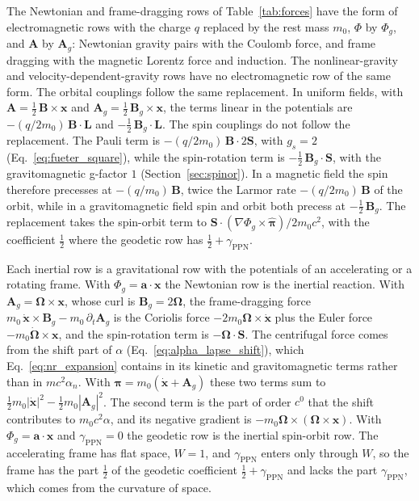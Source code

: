 \documentclass[aps,prd,onecolumn,tightenlines,nofootinbib,notitlepage,11pt,floatfix]{revtex4-2}
\theoremstyle{indentedtheorem}
\begin{document}
The Newtonian and frame-dragging rows of Table~\ref{tab:forces} have the form of electromagnetic rows with the charge $q$ replaced by the rest mass $m_0$, $\Phi$ by $\Phi_g$, and $\mathbf{A}$ by $\mathbf{A}_g$: Newtonian gravity pairs with the Coulomb force, and frame dragging with the magnetic Lorentz force and induction. The nonlinear-gravity and velocity-dependent-gravity rows have no electromagnetic row of the same form. The orbital couplings follow the same replacement. In uniform fields, with $\mathbf{A}=\tfrac{1}{2}\,\mathbf{B}\times\mathbf{x}$ and $\mathbf{A}_g=\tfrac{1}{2}\,\mathbf{B}_g\times\mathbf{x}$, the terms linear in the potentials are $-(q/2m_0)\,\mathbf{B}\cdot\mathbf{L}$ and $-\tfrac{1}{2}\,\mathbf{B}_g\cdot\mathbf{L}$. The spin couplings do not follow the replacement. The Pauli term is $-(q/2m_0)\,\mathbf{B}\cdot2\mathbf{S}$, with $g_s=2$ (Eq.~\eqref{eq:fueter_square}), while the spin-rotation term is $-\tfrac{1}{2}\,\mathbf{B}_g\cdot\mathbf{S}$, with the gravitomagnetic g-factor $1$ (Section~\ref{sec:spinor}). In a magnetic field the spin therefore precesses at $-(q/m_0)\,\mathbf{B}$, twice the Larmor rate $-(q/2m_0)\,\mathbf{B}$ of the orbit, while in a gravitomagnetic field spin and orbit both precess at $-\tfrac{1}{2}\,\mathbf{B}_g$. The replacement takes the spin-orbit term to $\mathbf{S}\cdot(\nabla\Phi_g\times\hat{\boldsymbol{\pi}})/2m_0c^2$, with the coefficient $\tfrac{1}{2}$ where the geodetic row has $\tfrac{1}{2}+\gamma_\text{PPN}$.

Each inertial row is a gravitational row with the potentials of an accelerating or a rotating frame. With $\Phi_g=\mathbf{a}\cdot\mathbf{x}$ the Newtonian row is the inertial reaction. With $\mathbf{A}_g=\boldsymbol{\Omega}\times\mathbf{x}$, whose curl is $\mathbf{B}_g=2\boldsymbol{\Omega}$, the frame-dragging force $m_0\,\dot{\mathbf{x}}\times\mathbf{B}_g-m_0\,\partial_t\mathbf{A}_g$ is the Coriolis force $-2m_0\boldsymbol{\Omega}\times\dot{\mathbf{x}}$ plus the Euler force $-m_0\dot{\boldsymbol{\Omega}}\times\mathbf{x}$, and the spin-rotation term is $-\boldsymbol{\Omega}\cdot\mathbf{S}$. The centrifugal force comes from the shift part of $\alpha$ (Eq.~\eqref{eq:alpha_lapse_shift}), which Eq.~\eqref{eq:nr_expansion} contains in its kinetic and gravitomagnetic terms rather than in $mc^2\alpha_n$. With $\boldsymbol{\pi}=m_0(\dot{\mathbf{x}}+\mathbf{A}_g)$ these two terms sum to $\tfrac{1}{2}m_0|\dot{\mathbf{x}}|^2-\tfrac{1}{2}m_0|\mathbf{A}_g|^2$. The second term is the part of order $c^0$ that the shift contributes to $m_0c^2\alpha$, and its negative gradient is $-m_0\boldsymbol{\Omega}\times(\boldsymbol{\Omega}\times\mathbf{x})$. With $\Phi_g=\mathbf{a}\cdot\mathbf{x}$ and $\gamma_\text{PPN}=0$ the geodetic row is the inertial spin-orbit row. The accelerating frame has flat space, $W=1$, and $\gamma_\text{PPN}$ enters only through $W$, so the frame has the part $\tfrac{1}{2}$ of the geodetic coefficient $\tfrac{1}{2}+\gamma_\text{PPN}$ and lacks the part $\gamma_\text{PPN}$, which comes from the curvature of space.
\end{document}
